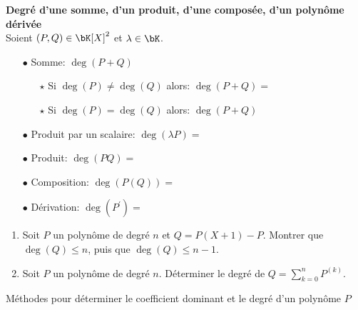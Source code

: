 \documentclass[a4paper, 11pt,reqno]{article}
\begin{document}
\begin{prop} \textbf{Degr\'e d'une somme, d'un produit, d'une compos\'ee, d'un polyn\^{o}me d\'eriv\'ee}\\
	\noindent Soient $(P,Q)\in \bK[X]^2$ et $\lambda\in\bK$.
	\begin{itemize}
		\item[$\bullet$] Somme: $\deg(P+Q)$ \dotfill\vsec
		      \begin{itemize}
			      \item[$\star$] Si $\deg(P)\not= \deg(Q)$ alors: $ \deg(P+Q)=$\dotfill\vsec
			      \item[$\star$] Si $\deg(P)= \deg(Q)$ alors: $ \deg(P+Q)$\dotfill\vsec
		      \end{itemize}
		\item[$\bullet$] Produit par un scalaire: $\deg(\lambda P)=$\dotfill \vsec
		\item[$\bullet$] Produit: $\deg(PQ)=$\dotfill \vsec
		\item[$\bullet$] Composition: $\deg(P(Q))=$\dotfill \vsec
		\item[$\bullet$] D\'erivation: $\deg (P^{\prime})=$\dotfill \vsec
	\end{itemize}
\end{prop}


{\footnotesize \begin{exercice}
	\begin{enumerate}
		\item Soit $P$ un polyn\^{o}me de degr\'e $n$ et $Q=P(X+1)-P$. Montrer que $\deg (Q)\leq n$, puis que $\deg (Q)\leq n-1$.
		\item Soit $P$ un polyn\^{o}me de degr\'e $n$. D\'eterminer le degr\'e de $Q=\sum\limits_{k=0}^n P^{(k)}$.
	\end{enumerate}
\end{exercice}
}\vsec





\colorbox{gray!40}{M\'ethodes pour d\'eterminer le coefficient dominant et le degr\'e d'un polyn\^ome $P$}\\
\end{document}
